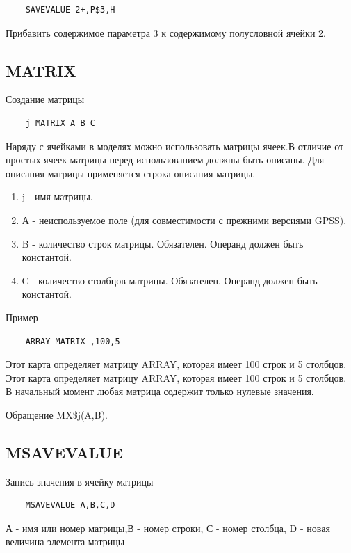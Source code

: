 \documentclass[14pt]{extarticle}
\begin{document}
\begin{lstlisting}
	SAVEVALUE 2+,Р$3,Н
\end{lstlisting}

Прибавить содержимое параметра 3 к содержимому полусловной ячейки 2.


\subsection*{MATRIX}

Создание матрицы

\begin{lstlisting}
	j MATRIX A B C
\end{lstlisting}

Наряду с ячейками в моделях можно использовать матрицы ячеек.В отличие от простых ячеек матрицы перед использованием должны быть описаны. Для описания матрицы применяется строка описания матрицы.

\begin{enumerate}
	\item j - имя матрицы.
	\item А - неиспользуемое поле (для совместимости с прежними версиями GPSS).
	\item B - количество строк матрицы. Обязателен. Операнд должен быть константой.
	\item С - количество столбцов матрицы. Обязателен. Операнд должен быть константой.
\end{enumerate}


Пример

\begin{lstlisting}
	ARRAY MATRIX ,100,5
\end{lstlisting}

Этот карта определяет матрицу ARRAY, которая имеет 100 строк и 5 столбцов. Этот карта определяет матрицу ARRAY, которая имеет 100 строк и 5 столбцов.
В начальный момент любая матрица содержит только нулевые значения.

Обращение MX\$j(A,B).

\subsection*{MSAVEVALUE}

Запись значения в ячейку матрицы

\begin{lstlisting}
	MSAVEVALUE A,B,C,D
\end{lstlisting}

А - имя или номер матрицы,В - номер строки, С - номер столбца, D - новая величина элемента матрицы
\end{document}
